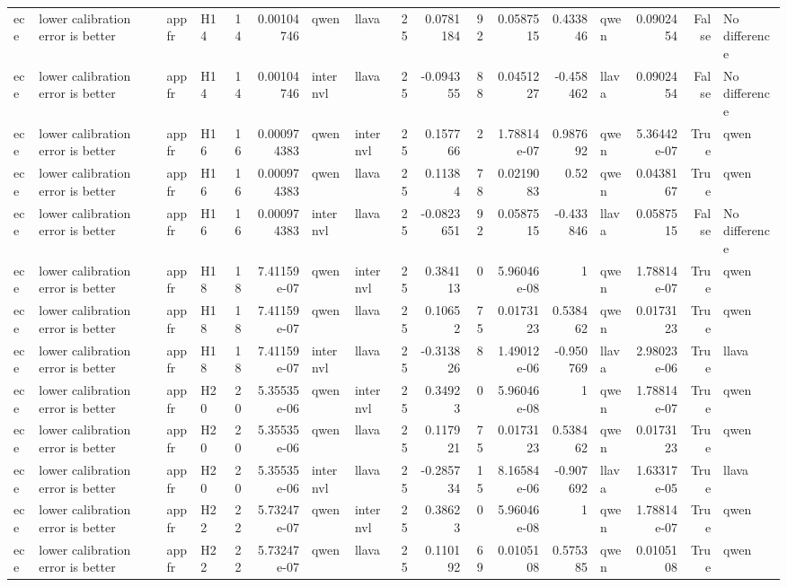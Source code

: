 \begin{longtable}{llllrrllrrrrrlrrl}
ece & lower calibration error is better & appfr & H14 & 14 & 0.00104746 & qwen & llava & 25 & 0.0781184 & 92 & 0.0587515 & 0.433846 & qwen & 0.0902454 & False & No difference \\
ece & lower calibration error is better & appfr & H14 & 14 & 0.00104746 & internvl & llava & 25 & -0.094355 & 88 & 0.0451227 & -0.458462 & llava & 0.0902454 & False & No difference \\
ece & lower calibration error is better & appfr & H16 & 16 & 0.000974383 & qwen & internvl & 25 & 0.157766 & 2 & 1.78814e-07 & 0.987692 & qwen & 5.36442e-07 & True & qwen \\
ece & lower calibration error is better & appfr & H16 & 16 & 0.000974383 & qwen & llava & 25 & 0.11384 & 78 & 0.0219083 & 0.52 & qwen & 0.0438167 & True & qwen \\
ece & lower calibration error is better & appfr & H16 & 16 & 0.000974383 & internvl & llava & 25 & -0.0823651 & 92 & 0.0587515 & -0.433846 & llava & 0.0587515 & False & No difference \\
ece & lower calibration error is better & appfr & H18 & 18 & 7.41159e-07 & qwen & internvl & 25 & 0.384113 & 0 & 5.96046e-08 & 1 & qwen & 1.78814e-07 & True & qwen \\
ece & lower calibration error is better & appfr & H18 & 18 & 7.41159e-07 & qwen & llava & 25 & 0.10652 & 75 & 0.0173123 & 0.538462 & qwen & 0.0173123 & True & qwen \\
ece & lower calibration error is better & appfr & H18 & 18 & 7.41159e-07 & internvl & llava & 25 & -0.313826 & 8 & 1.49012e-06 & -0.950769 & llava & 2.98023e-06 & True & llava \\
ece & lower calibration error is better & appfr & H20 & 20 & 5.35535e-06 & qwen & internvl & 25 & 0.34923 & 0 & 5.96046e-08 & 1 & qwen & 1.78814e-07 & True & qwen \\
ece & lower calibration error is better & appfr & H20 & 20 & 5.35535e-06 & qwen & llava & 25 & 0.117921 & 75 & 0.0173123 & 0.538462 & qwen & 0.0173123 & True & qwen \\
ece & lower calibration error is better & appfr & H20 & 20 & 5.35535e-06 & internvl & llava & 25 & -0.285734 & 15 & 8.16584e-06 & -0.907692 & llava & 1.63317e-05 & True & llava \\
ece & lower calibration error is better & appfr & H22 & 22 & 5.73247e-07 & qwen & internvl & 25 & 0.38623 & 0 & 5.96046e-08 & 1 & qwen & 1.78814e-07 & True & qwen \\
ece & lower calibration error is better & appfr & H22 & 22 & 5.73247e-07 & qwen & llava & 25 & 0.110192 & 69 & 0.0105108 & 0.575385 & qwen & 0.0105108 & True & qwen \\

\end{longtable}
